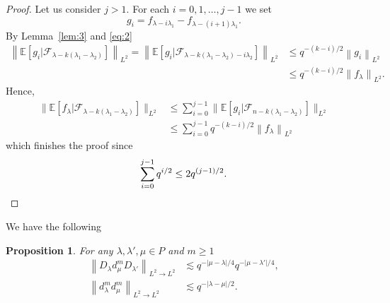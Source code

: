 \documentclass[a4paper]{amsart}
\newcommand{\norm}[1]{{\left\lVert #1 \right\rVert}}
\newcommand{\abs}[1]{{\lvert {#1} \rvert}}
\newcommand{\pnorm}[2]{{\norm{{#1}}_{L^{#2} \rightarrow L^{#2}}}}
\newcommand{\EE}{\mathbb{E}}
\theoremstyle{plain}
\newtheorem{proposition}{Proposition}[section]
\theoremstyle{definition}
\theoremstyle{remark}
\numberwithin{equation}{section}
\theoremstyle{plain}
\begin{document}
\begin{proof}
	Let us consider $j > 1$. For each $i = 0, 1, \ldots, j-1$ we set
	$$
	g_i = f_{\lambda - i \lambda_1} - f_{\lambda - (i+1) \lambda_1}.
	$$
	By Lemma~\ref{lem:3} and \eqref{eq:2}
	\begin{align*}
	\norm{\EE[g_i | \mathcal{F}_{\lambda-k(\lambda_1 - \lambda_2)}]}_{L^2}
	=\norm{\EE[g_i | \mathcal{F}_{\lambda - k(\lambda_1- \lambda_2) - i \lambda_2}]}_{L^2}
	& \leq q^{-(k-i)/2} \norm{g_i}_{L^2} \\
	& \leq q^{-(k-i)/2} \norm{f_\lambda}_{L^2}.
	\end{align*}
	Hence,
	\begin{align*}
	\big\lVert
	\EE[f_\lambda | \mathcal{F}_{\lambda - k(\lambda_1 - \lambda_2)}]
	\big\rVert_{L^2} 
	& \leq \sum_{i=0}^{j-1} 
	\big\lVert 
	\EE[g_i | \mathcal{F}_{n- k(\lambda_1-  \lambda_2)}]
	\big\rVert_{L^2} \\
	& \leq \sum_{i = 0}^{j-1} q^{-(k-i)/2} \norm{f_\lambda}_{L^2}
	\end{align*}
	which finishes the proof since
	\[
		\sum_{i = 0}^{j-1} q^{i/2} \leq 2 q^{(j-1)/2}. \qedhere
	\]
\end{proof}
We have the following
\begin{proposition}
	\label{prop:3}
	For any $\lambda, \lambda', \mu \in P$ and $m \geq 1$
	\begin{align*}
		\pnorm{D_\lambda d_\mu^m D_{\lambda'}}{2} & \lesssim q^{-\abs{\mu-\lambda}/4} 
		q^{-\abs{\mu-\lambda'}/4},\\
		\pnorm{d_\lambda^m d_\mu^m}{2} & \lesssim q^{-\abs{\lambda-\mu}/2}.
	\end{align*}
\end{proposition}
\end{document}
